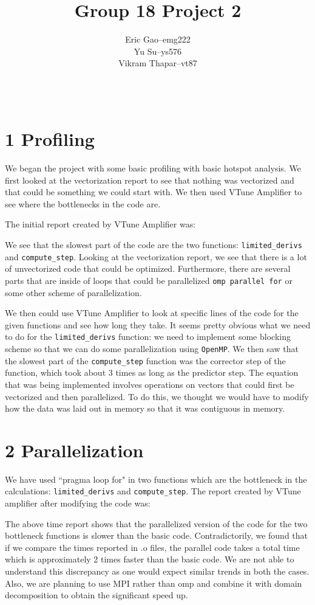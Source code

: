 \documentclass[11pt]{article}
\title{Group 18 Project 2} %
\author{
  \begin{tabular}{r c l}
    Eric Gao & -- & emg222\\
    Yu Su    & -- & ys576\\
    Vikram Thapar & -- & vt87
  \end{tabular}\\
  \rule{\linewidth}{0.4pt}
}
\date{}
\begin{document}
    \thispagestyle{empty}
    \maketitle

    \section{1 Profiling}
        We began the project with some basic profiling with basic hotspot analysis. We first looked at the vectorization report to see that nothing was vectorized and that could be something we could start with. We then used VTune Amplifier to see where the bottlenecks in the code are.

        The initial report created by VTune Amplifier was:
        

        We see that the slowest part of the code are the two functions: \texttt{limited\_derivs} and \texttt{compute\_step}. Looking at the vectorization report, we see that there is a lot of unvectorized code that could be optimized. Furthermore, there are several parts that are inside of loops that could be parallelized \texttt{omp parallel for} or some other scheme of parallelization.

        We then could use VTune Amplifier to look at specific lines of the code for the given functions and see how long they take. It seems pretty obvious what we need to do for the \texttt{limited\_derivs} function: we need to implement some blocking scheme so that we can do some parallelization using \texttt{OpenMP}. We then saw that the slowest part of the \texttt{compute\_step} function was the corrector step of the function, which took about 3 times as long as the predictor step. The equation that was being implemented involves operations on vectors that could first be vectorized and then parallelized. To do this, we thought we would have to modify how the data was laid out in memory so that it was contiguous in memory.
        
    \section{2 Parallelization}
        We have used  ``pragma loop for" in two functions which are the bottleneck in the calculations: \texttt{limited\_derivs} and \texttt{compute\_step}. The report created by VTune amplifier after modifying the code was:
        
        The above time report shows that the parallelized version of the code for the two bottleneck functions is slower than the basic code. Contradictorily, we found that if we compare the times reported in .o files, the parallel code takes a total time which is approximately 2 times faster than the basic code. We are not able to understand this discrepancy as one would expect similar trends in both the cases. Also, we are planning to use MPI rather than omp and combine it with domain decomposition to obtain the significant speed up. 
    
\end{document}
